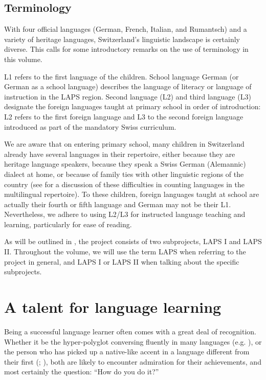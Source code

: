 \documentclass[output=paper]{langsci/langscibook}
\begin{document}
\subsection{Terminology}

With four official languages (German, French, Italian, and Rumantsch) and a variety of heritage languages, Switzerland’s linguistic landscape is certainly diverse. This calls for some introductory remarks on the use of terminology in this volume. 

L1 refers to the first language of the children. School language German (or German as a school language) describes the language of literacy or language of instruction in the LAPS region. Second language (L2) and third language (L3) designate the foreign languages taught at primary school in order of introduction: L2 refers to the first foreign language and L3 to the second foreign language introduced as part of the mandatory Swiss curriculum. 

We are aware that on entering primary school, many children in Switzerland already have several languages in their repertoire, either because they are heritage language speakers, because they speak a Swiss German (Alemannic) dialect at home, or because of family ties with other linguistic regions of the country (see \citealt{Berthele2020} for a discussion of these difficulties in counting languages in the multilingual repertoire). To these children, foreign languages taught at school are actually their fourth or fifth language and German may not be their L1. Nevertheless, we adhere to using L2/L3 for instructed language teaching and learning, particularly for ease of reading.

As will be outlined in , the project consists of two subprojects, LAPS I and LAPS II. Throughout the volume, we will use the term LAPS when referring to the project in general, and LAPS I or LAPS II when talking about the specific subprojects.

\section{A talent for language learning} 

Being a successful language learner often comes with a great deal of recognition. Whether it be the hyper-polyglot conversing fluently in many languages (e.g. \citealt{Erard2012}), or the person who has picked up a native-like accent in a language different from their first (\citealt{FlegeMackay2011}; \citealt{ChristinerReiterer2015}), both are likely to encounter admiration for their achievements, and most certainly the question: “How do you do it?” 
\end{document}
